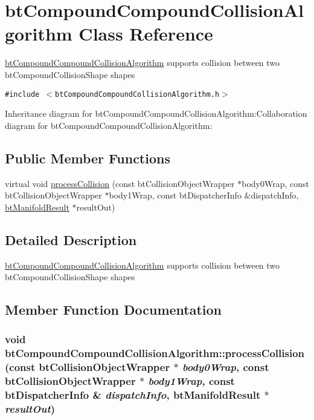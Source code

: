 \hypertarget{classbt_compound_compound_collision_algorithm}{
\section{btCompoundCompoundCollisionAlgorithm Class Reference}
\label{classbt_compound_compound_collision_algorithm}
}
\hyperlink{classbt_compound_compound_collision_algorithm}{btCompoundCompoundCollisionAlgorithm} supports collision between two btCompoundCollisionShape shapes  


{\tt \#include $<$btCompoundCompoundCollisionAlgorithm.h$>$}

Inheritance diagram for btCompoundCompoundCollisionAlgorithm:Collaboration diagram for btCompoundCompoundCollisionAlgorithm:\subsection*{Public Member Functions}
\begin{CompactItemize}
\item 
virtual void \hyperlink{classbt_compound_compound_collision_algorithm_5fb9d60f9713c0e3795c89390353beb3}{processCollision} (const btCollisionObjectWrapper $\ast$body0Wrap, const btCollisionObjectWrapper $\ast$body1Wrap, const btDispatcherInfo \&dispatchInfo, \hyperlink{classbt_manifold_result}{btManifoldResult} $\ast$resultOut)
\end{CompactItemize}


\subsection{Detailed Description}
\hyperlink{classbt_compound_compound_collision_algorithm}{btCompoundCompoundCollisionAlgorithm} supports collision between two btCompoundCollisionShape shapes 

\subsection{Member Function Documentation}
\hypertarget{classbt_compound_compound_collision_algorithm_5fb9d60f9713c0e3795c89390353beb3}{
\subsubsection[processCollision]{\setlength{\rightskip}{0pt plus 5cm}void btCompoundCompoundCollisionAlgorithm::processCollision (const btCollisionObjectWrapper $\ast$ {\em body0Wrap}, \/  const btCollisionObjectWrapper $\ast$ {\em body1Wrap}, \/  const btDispatcherInfo \& {\em dispatchInfo}, \/  {\bf btManifoldResult} $\ast$ {\em resultOut})}}
\label{classbt_compound_compound_collision_algorithm_5fb9d60f9713c0e3795c89390353beb3}




